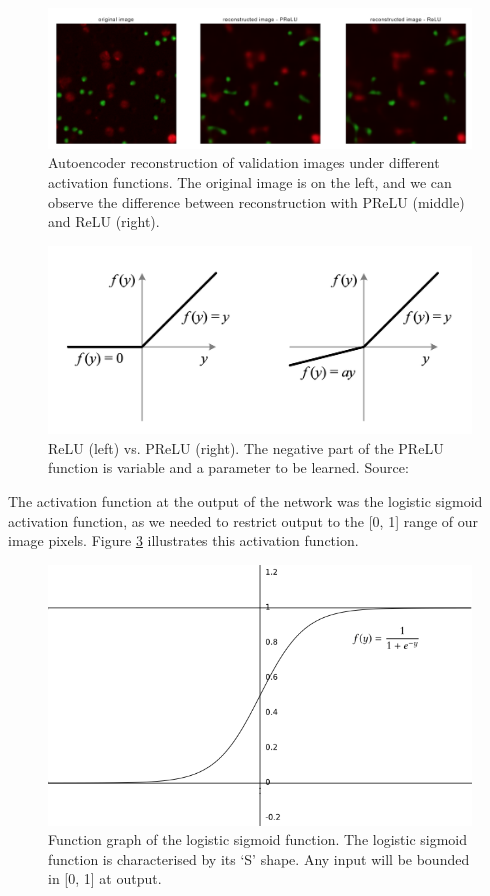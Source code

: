 \begin{figure}
    \centering
    \includegraphics[width=\textwidth]{dissertation/figures/relu_prelu_reconstruction.png}
    \caption{Autoencoder reconstruction of validation images under different activation functions. The original image is on the left, and we can observe the difference between reconstruction with PReLU (middle) and ReLU (right).}
    \label{fig:relu_prelu_reconstruction}
\end{figure}

\begin{figure}[h]
    \centering
    \includegraphics[width=.6\textwidth]{dissertation/figures/relu_prelu.png}
    \caption{ReLU (left) vs. PReLU (right). The negative part of the PReLU function is variable and a parameter to be learned. Source: \citet{he_2015}}
    \label{fig:relu_prelu}
\end{figure}

The activation function at the output of the network was the logistic sigmoid activation function, as we needed to restrict output to the [0, 1] range of our image pixels. Figure \ref{fig:sigmoid} illustrates this activation function.

\begin{figure}[h]
    \centering
    \includegraphics[width=.5\textwidth]{dissertation/figures/sigmoid.png}
    \caption{Function graph of the logistic sigmoid function. The logistic sigmoid function is characterised by its `S' shape. Any input will be bounded in [0, 1] at output.}
    \label{fig:sigmoid}
\end{figure}

